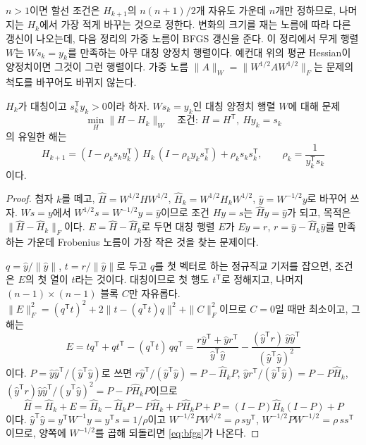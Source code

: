 $n>1$이면 할선 조건은 $H_{k+1}$의 $n(n+1)/2$개 자유도 가운데 $n$개만 정하므로, 나머지는 $H_k$에서 가장 적게 바꾸는 것으로 정한다. 변화의 크기를 재는 노름에 따라 다른 갱신이 나오는데, 다음 정리의 가중 노름이 BFGS 갱신을 준다. 이 정리에서 무게 행렬 $W$는 $Ws_k=y_k$를 만족하는 아무 대칭 양정치 행렬이다. 예컨대 위의 평균 Hessian이 양정치이면 그것이 그런 행렬이다. 가중 노름 $\|A\|_W=\|W^{1/2}AW^{1/2}\|_F$는 문제의 척도를 바꾸어도 바뀌지 않는다.

\begin{theorem}
\label{thm:bfgs-variational}
$H_k$가 대칭이고 $s_k^{\mathsf T}y_k>0$이라 하자. $Ws_k=y_k$인 대칭 양정치 행렬 $W$에 대해 문제
\[
\min_H\|H-H_k\|_W\quad\text{조건: }H=H^{\mathsf T},\ Hy_k=s_k
\]
의 유일한 해는
\begin{equation}
H_{k+1}=(I-\rho_ks_ky_k^{\mathsf T})\,H_k\,(I-\rho_ky_ks_k^{\mathsf T})+\rho_ks_ks_k^{\mathsf T},\qquad\rho_k=\frac1{y_k^{\mathsf T}s_k}
\label{eq:bfgs}
\end{equation}
이다.
\end{theorem}

\begin{proof}
첨자 $k$를 떼고, $\hat H=W^{1/2}HW^{1/2}$, $\hat H_k=W^{1/2}H_kW^{1/2}$, $\hat y=W^{-1/2}y$로 바꾸어 쓰자. $Ws=y$에서 $W^{1/2}s=W^{-1/2}y=\hat y$이므로 조건 $Hy=s$는 $\hat H\hat y=\hat y$가 되고, 목적은 $\|\hat H-\hat H_k\|_F$이다. $E=\hat H-\hat H_k$로 두면 대칭 행렬 $E$가 $E\hat y=r$, $r=\hat y-\hat H_k\hat y$를 만족하는 가운데 Frobenius 노름이 가장 작은 것을 찾는 문제이다.

$q=\hat y/\|\hat y\|$, $t=r/\|\hat y\|$로 두고 $q$를 첫 벡터로 하는 정규직교 기저를 잡으면, 조건은 $E$의 첫 열이 $t$라는 것이다. 대칭이므로 첫 행도 $t^{\mathsf T}$로 정해지고, 나머지 $(n-1)\times(n-1)$ 블록 $C$만 자유롭다. $\|E\|_F^2=(q^{\mathsf T}t)^2+2\|t-(q^{\mathsf T}t)q\|^2+\|C\|_F^2$이므로 $C=0$일 때만 최소이고, 그 해는
\[
E=tq^{\mathsf T}+qt^{\mathsf T}-(q^{\mathsf T}t)\,qq^{\mathsf T}=\frac{r\hat y^{\mathsf T}+\hat yr^{\mathsf T}}{\hat y^{\mathsf T}\hat y}-\frac{(\hat y^{\mathsf T}r)\,\hat y\hat y^{\mathsf T}}{(\hat y^{\mathsf T}\hat y)^2}
\]
이다. $P=\hat y\hat y^{\mathsf T}/(\hat y^{\mathsf T}\hat y)$로 쓰면 $r\hat y^{\mathsf T}/(\hat y^{\mathsf T}\hat y)=P-\hat H_kP$, $\hat yr^{\mathsf T}/(\hat y^{\mathsf T}\hat y)=P-P\hat H_k$, $(\hat y^{\mathsf T}r)\hat y\hat y^{\mathsf T}/(\hat y^{\mathsf T}\hat y)^2=P-P\hat H_kP$이므로
\[
\hat H=\hat H_k+E=\hat H_k-\hat H_kP-P\hat H_k+P\hat H_kP+P=(I-P)\hat H_k(I-P)+P
\]
이다. $\hat y^{\mathsf T}\hat y=y^{\mathsf T}W^{-1}y=y^{\mathsf T}s=1/\rho$이고 $W^{-1/2}PW^{1/2}=\rho\,sy^{\mathsf T}$, $W^{-1/2}PW^{-1/2}=\rho\,ss^{\mathsf T}$이므로, 양쪽에 $W^{-1/2}$를 곱해 되돌리면 \eqref{eq:bfgs}가 나온다.
\end{proof}

